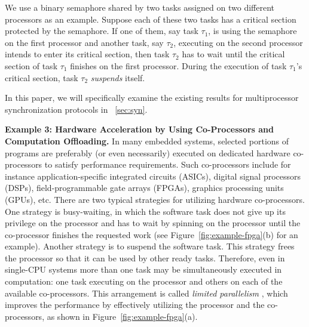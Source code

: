 We use a binary semaphore shared by two tasks assigned on two different processors as an example. Suppose each of these two tasks has a critical section protected by the semaphore. If one of them, say task $\tau_1$, is using the semaphore on the first processor and another task, say $\tau_2$, executing on the second processor intends to enter its critical section, then task $\tau_2$ has to wait until the critical section of task $\tau_1$ finishes on the first processor. During the execution of task $\tau_1$'s critical section, task $\tau_2$ \emph{suspends} itself. 


In this paper, we will specifically examine the existing results for multiprocessor synchronization protocols in \mysectionref{}~\ref{sec:syn}. %




{\bf Example 3: Hardware Acceleration by Using Co-Processors and Computation Offloading.} \hspace{0.1in}
 In many embedded systems, selected portions of programs are preferably (or even necessarily) executed on dedicated hardware co-processors to satisfy performance requirements.  Such co-processors include for instance application-specific integrated circuits (ASICs), digital signal processors (DSPs), field-programmable gate arrays (FPGAs), graphics processing units (GPUs), etc. There are two typical strategies for utilizing hardware co-processors. One strategy is busy-waiting, in which the software task does not give up its privilege on the processor and has to wait by spinning on the processor until the co-processor finishes the requested work (see Figure~\ref{fig:example-fpga}(b) for an example). Another strategy is to suspend the software task. This strategy frees the processor so that it can be used by other ready tasks. Therefore, even in single-CPU systems more than one task may be simultaneously executed in computation: one task executing on the processor and others on each of the available co-processors. This arrangement is called \emph{limited parallelism} \cite{RTAS-AudsleyB04}, which improves the performance by effectively utilizing the processor and the co-processors, as shown in Figure~\ref{fig:example-fpga}(a).

